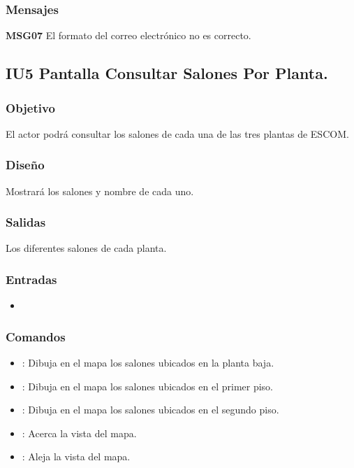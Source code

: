 \subsubsection{Mensajes}
\begin{Citemize}
	\item {\bf MSG07} El formato del correo electrónico no es correcto.
\end{Citemize}






\pagebreak
\subsection{IU5 Pantalla Consultar Salones Por Planta.}

\subsubsection{Objetivo}
	El actor podrá consultar los salones de cada una de las tres plantas de ESCOM.

\subsubsection{Diseño}
	Mostrará los salones y nombre de cada uno.


\subsubsection{Salidas}

	Los diferentes salones de cada planta.

\subsubsection{Entradas}

\begin{itemize}
	\item
\end{itemize}

\subsubsection{Comandos}
\begin{itemize}
	\item {}: Dibuja en el mapa los salones ubicados en la planta baja.
	\item {}: Dibuja en el mapa los salones ubicados en el primer piso.
	\item {}: Dibuja en el mapa los salones ubicados en el segundo piso.
	\item \IUbutton{  +  }: Acerca la vista del mapa.
	\item \IUbutton{  -  }: Aleja la vista del mapa.
\end{itemize}

